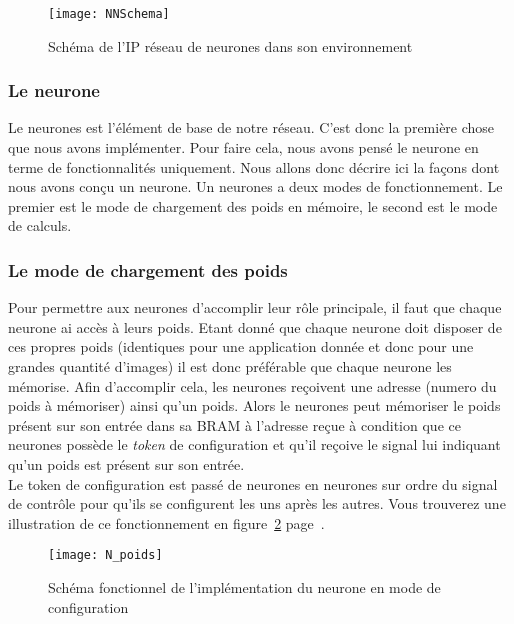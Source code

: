 \begin{figure}[h!]
	\begin{center}
		\texttt{[image: NNSchema]}
		\label{fig:NNSchema}
		\caption{Schéma de l'IP réseau de neurones dans son environnement }
	\end{center}
\end{figure}

\subsubsection{Le neurone}
	Le neurones est l'élément de base de notre réseau.
	C'est donc la première chose que nous avons implémenter.
	Pour faire cela, nous avons pensé le neurone en terme de
	fonctionnalités uniquement.
	Nous allons donc décrire ici la façons dont nous avons conçu un neurone. 
	Un neurones a deux modes de fonctionnement.
	Le premier est le mode de chargement des poids en mémoire, le second
	est le mode de calculs.

	\subsubsection{Le mode de chargement des poids}
	Pour permettre aux neurones d'accomplir leur rôle principale, il faut que chaque neurone ai
	accès à leurs poids. Etant donné que chaque neurone doit disposer de ces propres poids
	(identiques pour une application donnée et donc pour une grandes quantité d'images)
	il est donc préférable que chaque neurone les mémorise. Afin d'accomplir cela,
	les neurones reçoivent une adresse (numero du poids à mémoriser) ainsi qu'un poids.
	Alors le neurones peut mémoriser le poids présent sur son entrée dans
	sa BRAM à l'adresse reçue à condition que ce neurones possède le {\em token} de
	configuration et qu'il reçoive le signal lui indiquant qu'un poids est présent sur son entrée.\\
	Le token de configuration est passé de neurones en neurones
	sur ordre du signal de contrôle pour qu'ils se configurent les uns après les autres.
	Vous trouverez une illustration de ce fonctionnement en
	figure~\ref{fig:N_poids} page~\pageref{fig:N_poids}.
	\begin{figure}[h!]
		\begin{center}
			\texttt{[image: N\_poids]}
			\caption{Schéma fonctionnel de l'implémentation du neurone en mode de configuration}
			\label{fig:N_poids}
		\end{center}
	\end{figure}

